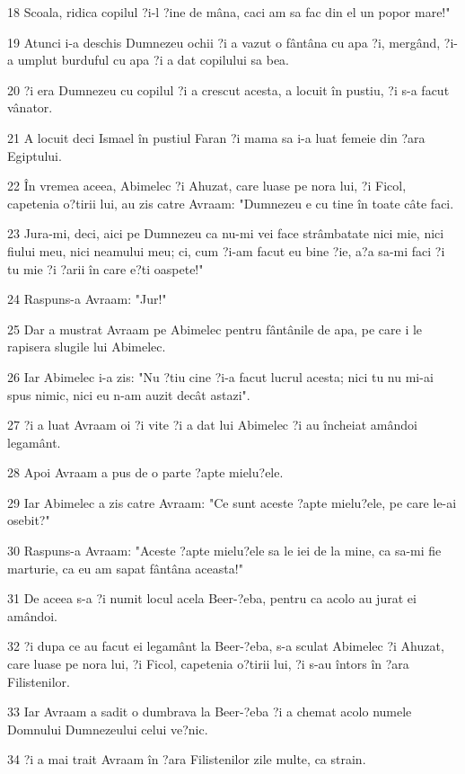 \par 18 Scoala, ridica copilul ?i-l ?ine de mâna, caci am sa fac din el un popor mare!"
\par 19 Atunci i-a deschis Dumnezeu ochii ?i a vazut o fântâna cu apa ?i, mergând, ?i-a umplut burduful cu apa ?i a dat copilului sa bea.
\par 20 ?i era Dumnezeu cu copilul ?i a crescut acesta, a locuit în pustiu, ?i s-a facut vânator.
\par 21 A locuit deci Ismael în pustiul Faran ?i mama sa i-a luat femeie din ?ara Egiptului.
\par 22 În vremea aceea, Abimelec ?i Ahuzat, care luase pe nora lui, ?i Ficol, capetenia o?tirii lui, au zis catre Avraam: "Dumnezeu e cu tine în toate câte faci.
\par 23 Jura-mi, deci, aici pe Dumnezeu ca nu-mi vei face strâmbatate nici mie, nici fiului meu, nici neamului meu; ci, cum ?i-am facut eu bine ?ie, a?a sa-mi faci ?i tu mie ?i ?arii în care e?ti oaspete!"
\par 24 Raspuns-a Avraam: "Jur!"
\par 25 Dar a mustrat Avraam pe Abimelec pentru fântânile de apa, pe care i le rapisera slugile lui Abimelec.
\par 26 Iar Abimelec i-a zis: "Nu ?tiu cine ?i-a facut lucrul acesta; nici tu nu mi-ai spus nimic, nici eu n-am auzit decât astazi".
\par 27 ?i a luat Avraam oi ?i vite ?i a dat lui Abimelec ?i au încheiat amândoi legamânt.
\par 28 Apoi Avraam a pus de o parte ?apte mielu?ele.
\par 29 Iar Abimelec a zis catre Avraam: "Ce sunt aceste ?apte mielu?ele, pe care le-ai osebit?"
\par 30 Raspuns-a Avraam: "Aceste ?apte mielu?ele sa le iei de la mine, ca sa-mi fie marturie, ca eu am sapat fântâna aceasta!"
\par 31 De aceea s-a ?i numit locul acela Beer-?eba, pentru ca acolo au jurat ei amândoi.
\par 32 ?i dupa ce au facut ei legamânt la Beer-?eba, s-a sculat Abimelec ?i Ahuzat, care luase pe nora lui, ?i Ficol, capetenia o?tirii lui, ?i s-au întors în ?ara Filistenilor.
\par 33 Iar Avraam a sadit o dumbrava la Beer-?eba ?i a chemat acolo numele Domnului Dumnezeului celui ve?nic.
\par 34 ?i a mai trait Avraam în ?ara Filistenilor zile multe, ca strain.

